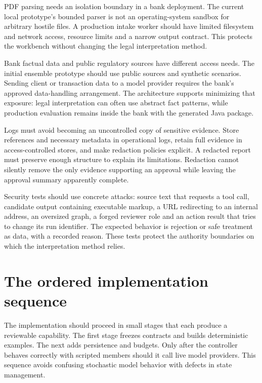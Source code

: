 PDF parsing needs an isolation boundary in a bank deployment. The current local
prototype's bounded parser is not an operating-system sandbox for arbitrary
hostile files. A production intake worker should have limited filesystem and
network access, resource limits and a narrow output contract. This protects the
workbench without changing the legal interpretation method.

Bank factual data and public regulatory sources have different access needs.
The initial ensemble prototype should use public sources and synthetic scenarios.
Sending client or transaction data to a model provider requires the bank's
approved data-handling arrangement. The architecture supports minimizing that
exposure: legal interpretation can often use abstract fact patterns, while
production evaluation remains inside the bank with the generated Java package.

Logs must avoid becoming an uncontrolled copy of sensitive evidence. Store
references and necessary metadata in operational logs, retain full evidence in
access-controlled stores, and make redaction policies explicit. A redacted report
must preserve enough structure to explain its limitations. Redaction cannot
silently remove the only evidence supporting an approval while leaving the
approval summary apparently complete.

Security tests should use concrete attacks: source text that requests a tool
call, candidate output containing executable markup, a URL redirecting to an
internal address, an oversized graph, a forged reviewer role and an action result
that tries to change its run identifier. The expected behavior is rejection or
safe treatment as data, with a recorded reason. These tests protect the authority
boundaries on which the interpretation method relies.

\section{The ordered implementation sequence}
\label{merge:M08:11}


The implementation should proceed in small stages that each produce a reviewable
capability. The first stage freezes contracts and builds deterministic examples.
The next adds persistence and budgets. Only after the controller behaves correctly
with scripted members should it call live model providers. This sequence avoids
confusing stochastic model behavior with defects in state management.

